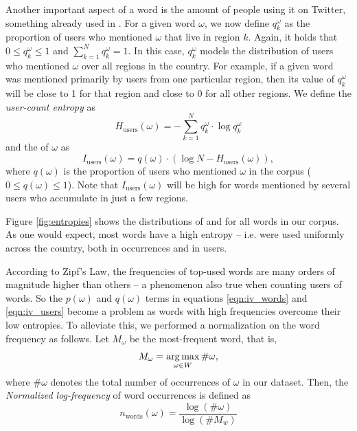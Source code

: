 Another important aspect of a word is the amount of people using it on Twitter, something already used in  \citet{Cui:2012:DBE:2396761.2398519}. For a given word $\omega$, we now define $q_k^\omega$ as the proportion of users who mentioned $\omega$ that live in region $k$. Again, it holds that $0 \leq q_k^\omega \leq 1$ and $\sum_{k=1}^N q_k^\omega = 1$.
In this case, $q_k^\omega$ models the distribution of users who mentioned $\omega$ over all regions in the country. For example, if a given word was mentioned primarily by users from one particular region, then its value of $q_k^\omega$ will be close to 1 for that region and close to 0 for all other regions.  We define the \emph{user-count entropy} as
\begin{equation}
    H_\text{users}(\omega) = -\sum \limits_{k=1}^{N} q_k^{\omega} \cdot \log q_k^{\omega}
\end{equation}
and the \usermetric{} of  $\omega$ as
\begin{equation}
  \label{eqn:iv_users}
  I_\text{users}(\omega) = q(\omega) \cdot (\log N - H_\text{users}(\omega)),
\end{equation}
where $q(\omega)$ is the proportion of users who mentioned $\omega$ in the corpus ($0 \leq q(\omega) \leq 1$). Note that $I_\text{users}(\omega)$ will be high for words mentioned by several users who accumulate in just a few regions.

Figure \ref{fig:entropies} shows the distributions of \wordentropy{} and \userentropy{} for all words in our corpus. As one would expect, most words have a high entropy -- i.e. were used uniformly across the country, both in occurrences and in users.

According to Zipf's Law, the frequencies of top-used words are many orders of magnitude higher than others -- a phenomenon also true when counting users of words. So the $p(\omega)$ and $q(\omega)$ terms in equations \eqref{eqn:iv_words} and \eqref{eqn:iv_users} become a problem as words with high frequencies overcome their low entropies. To alleviate this, we performed a normalization on the word frequency as follows. Let $M_\omega$ be the most-frequent word, that is,
\begin{equation}
    M_\omega = \operatorname*{arg\,max}\limits_{\omega \in W} \#\omega,
\end{equation}
where $\#\omega$ denotes the total number of occurrences of $\omega$ in our dataset. Then, the \emph{Normalized log-frequency} of word occurrences is defined as
\begin{equation}
    n_\text{words}(\omega) = \frac{\log(\# \omega)}{\log(\# M_w)}
\end{equation}

